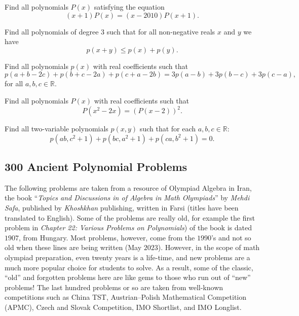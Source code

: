 \begin{question}
Find all polynomials $ P(x)$ satisfying the equation
\[(x+1)P(x)=(x-2010)P(x+1).\]
\end{question}




\begin{question}
Find all polynomials of degree $3$ such that for all non-negative reals $x$ and $y$ we have
\[p(x+y) \leq p(x)+p(y).\]
\end{question}



\begin{question}
Find all polynomials $p(x)$ with real coefficients such that
\[p(a + b - 2c) + p(b + c - 2a) + p(c + a - 2b) = 3p(a - b) + 3p(b - c) + 3p(c - a),\]
for all $a, b, c\in\mathbb{R}$.
\end{question}



\begin{question}
Find all  polynomials $P(x)$ with real coefficients such that
\[P(x^2-2x)=\left(P(x-2)\right)^2.\]
\end{question}



\begin{question}
Find all two-variable polynomials $p(x,y)$ such that for each $a,b,c\in\mathbb R$:
\[p(ab,c^2+1)+p(bc,a^2+1)+p(ca,b^2+1)=0.\]
\end{question}


\newpage
\subsection{300 Ancient Polynomial Problems}
The following problems are taken from a resource of Olympiad Algebra in Iran, the book ``\textit{Topics and Discussions in of Algebra in Math Olympiads}'' by \textit{Mehdi Safa}, published by \textit{Khoshkhan} publishing, written in Farsi (titles have been translated to English). Some of the problems are really old, for example the first problem in \textit{Chapter 22: Various Problems on Polynomials}) of the book is dated $1907$, from Hungary. Most problems, however, come from the $1990$'s and not so old when these lines are being written (May $2023$). However, in the scope of math olympiad preparation, even twenty years is a life-time, and new problems are a much more popular choice for students to solve. As a result, some of the classic, ``old'' and forgotten problems here are like gems to those who run out of ``new'' problems! The last hundred problems or so are taken from well-known competitions such as China TST, Austrian--Polish Mathematical Competition (APMC), Czech and Slovak Competition, IMO Shortlist, and IMO Longlist.


